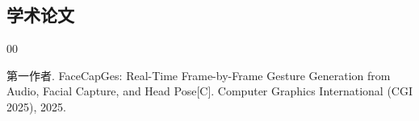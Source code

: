 
\begin{achievements}

\subsection*{学术论文}

\begin{bibliolist}{00}

\item 第一作者. FaceCapGes: Real-Time Frame-by-Frame Gesture Generation from Audio, Facial Capture, and Head Pose[C]. Computer Graphics International (CGI 2025), 2025.

\end{bibliolist}



\end{achievements}
